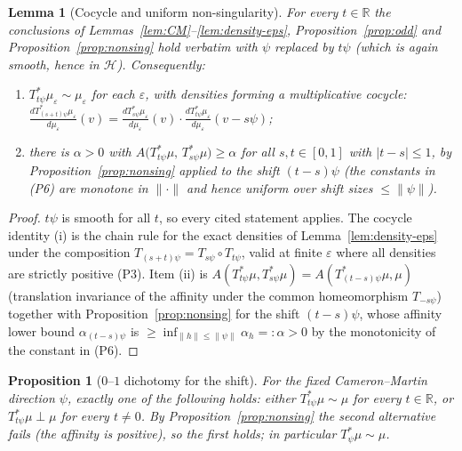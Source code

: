 \documentclass[12pt]{article}
\newcommand{\bR}{\mathbb{R}}
\newcommand{\cH}{\mathcal{H}}
\newcommand{\eps}{\varepsilon}
\theoremstyle{plain}
\newtheorem{lemma}{Lemma}
\newtheorem{proposition}{Proposition}
\theoremstyle{definition}
\begin{document}
\begin{lemma}[Cocycle and uniform non-singularity]\label{lem:cocycle}
For every $t\in\bR$ the conclusions of Lemmas~\ref{lem:CM}--\ref{lem:density-eps},
Proposition~\ref{prop:odd} and Proposition~\ref{prop:nonsing} hold verbatim with
$\psi$ replaced by $t\psi$ (which is again smooth, hence in $\cH$). Consequently:
\begin{enumerate}
\item[(i)] $T_{t\psi}^*\mu_\eps\sim\mu_\eps$ for each $\eps$, with densities forming a
multiplicative cocycle:
$\frac{dT_{(s+t)\psi}^*\mu_\eps}{d\mu_\eps}(v)
=\frac{dT_{s\psi}^*\mu_\eps}{d\mu_\eps}(v)\cdot\frac{dT_{t\psi}^*\mu_\eps}{d\mu_\eps}(v-s\psi)$;
\item[(ii)] there is $\alpha>0$ with $A\big(T_{t\psi}^*\mu,\,T_{s\psi}^*\mu\big)\ge\alpha$
for all $s,t\in[0,1]$ with $|t-s|\le1$, by Proposition~\ref{prop:nonsing} applied to
the shift $(t-s)\psi$ (the constants in \textnormal{(P6)} are monotone in $\|\cdot\|$
and hence uniform over shift sizes $\le\|\psi\|$).
\end{enumerate}
\end{lemma}

\begin{proof}
$t\psi$ is smooth for all $t$, so every cited statement applies. The cocycle identity
(i) is the chain rule for the exact densities of Lemma~\ref{lem:density-eps} under
the composition $T_{(s+t)\psi}=T_{s\psi}\circ T_{t\psi}$, valid at finite $\eps$ where
all densities are strictly positive (P3). Item (ii) is
$A(T_{t\psi}^*\mu,T_{s\psi}^*\mu)=A(T_{(t-s)\psi}^*\mu,\mu)$ (translation invariance of
the affinity under the common homeomorphism $T_{-s\psi}$) together with
Proposition~\ref{prop:nonsing} for the shift $(t-s)\psi$, whose affinity lower bound
$\alpha_{(t-s)\psi}$ is $\ge\inf_{\|h\|\le\|\psi\|}\alpha_h=:\alpha>0$ by the
monotonicity of the constant in \textnormal{(P6)}.
\end{proof}

\begin{proposition}[$0$--$1$ dichotomy for the shift]\label{prop:01}
For the fixed Cameron--Martin direction $\psi$, exactly one of the following holds:
either $T_{t\psi}^*\mu\sim\mu$ for every $t\in\bR$, or $T_{t\psi}^*\mu\perp\mu$ for
every $t\neq0$. By Proposition~\ref{prop:nonsing} the second alternative fails (the
affinity is positive), so the first holds; in particular $T_\psi^*\mu\sim\mu$.
\end{proposition}
\end{document}
